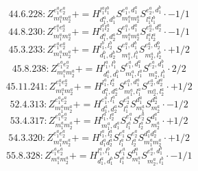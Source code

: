 \documentclass[letterpaper,10pt,fleqn,leqno,onecolumn]{article}
\begin{document}
\begin{equation} \;\;\;\;\;\;  44.6.228: Z^{e_{1}^{a}e_{2}^{a}}_{m_{1}^{a}m_{2}^{a}}+=H^{l_{1}^{a}l_{1}^{b}}_{d_{1}^{a},d_{1}^{b}}S^{e_{1}^{a},d_{1}^{a}}_{m_{1}^{a}m_{2}^{a}}S^{e_{2}^{a},d_{1}^{b}}_{l_{1}^{a}l_{1}^{b}}\cdot -1/1 \end{equation}
\begin{equation} \;\;\;\;\;\;  44.8.230: Z^{e_{1}^{a}e_{2}^{a}}_{m_{1}^{a}m_{2}^{a}}+=H^{l_{1}^{a}l_{2}^{a}}_{d_{1}^{a},d_{2}^{a}}S^{e_{1}^{a},d_{1}^{a}}_{m_{1}^{a}m_{2}^{a}}S^{e_{2}^{a},d_{2}^{a}}_{l_{1}^{a}l_{2}^{a}}\cdot -1/1 \end{equation}
\begin{equation} \;\;\;\;\;\;  45.3.233: Z^{e_{1}^{a}e_{2}^{a}}_{m_{1}^{a}m_{2}^{a}}+=H^{l_{1}^{b},l_{2}^{b}}_{d_{1}^{b},d_{2}^{b}}S^{e_{1}^{a},d_{1}^{b}}_{m_{1}^{a},l_{1}^{b}}S^{e_{2}^{a},d_{2}^{b}}_{m_{2}^{a},l_{2}^{b}}\cdot +1/2 \end{equation}
\begin{equation} \;\;\;\;\;\;  45.8.238: Z^{e_{1}^{a}e_{2}^{a}}_{m_{1}^{a}m_{2}^{a}}+=H^{l_{1}^{a},l_{1}^{b}}_{d_{1}^{a},d_{1}^{b}}S^{e_{1}^{a},d_{1}^{a}}_{m_{1}^{a},l_{1}^{a}}S^{e_{2}^{a},d_{1}^{b}}_{m_{2}^{a},l_{1}^{b}}\cdot 2/2 \end{equation}
\begin{equation} \;\;\;\;\;\;  45.11.241: Z^{e_{1}^{a}e_{2}^{a}}_{m_{1}^{a}m_{2}^{a}}+=H^{l_{1}^{a},l_{2}^{a}}_{d_{1}^{a},d_{2}^{a}}S^{e_{1}^{a},d_{1}^{a}}_{m_{1}^{a},l_{1}^{a}}S^{e_{2}^{a},d_{2}^{a}}_{m_{2}^{a},l_{2}^{a}}\cdot +1/2 \end{equation}
\begin{equation} \;\;\;\;\;\;  52.4.313: Z^{e_{1}^{a}e_{2}^{a}}_{m_{1}^{a}m_{2}^{a}}+=H^{e_{1}^{a},l_{1}^{a}}_{d_{1}^{a},d_{2}^{a}}S^{e_{2}^{a}}_{l_{1}^{a}}S^{d_{1}^{a}}_{m_{1}^{a}}S^{d_{2}^{a}}_{m_{2}^{a}}\cdot -1/2 \end{equation}
\begin{equation} \;\;\;\;\;\;  53.4.317: Z^{e_{1}^{a}e_{2}^{a}}_{m_{1}^{a}m_{2}^{a}}+=H^{l_{1}^{a},l_{2}^{a}}_{m_{1}^{a},d_{1}^{a}}S^{e_{1}^{a}}_{l_{1}^{a}}S^{e_{2}^{a}}_{l_{2}^{a}}S^{d_{1}^{a}}_{m_{2}^{a}}\cdot +1/2 \end{equation}
\begin{equation} \;\;\;\;\;\;  54.3.320: Z^{e_{1}^{a}e_{2}^{a}}_{m_{1}^{a}m_{2}^{a}}+=H^{l_{1}^{a},l_{2}^{a}}_{d_{1}^{a}d_{2}^{a}}S^{e_{1}^{a}}_{l_{1}^{a}}S^{e_{2}^{a}}_{l_{2}^{a}}S^{d_{1}^{a}d_{2}^{a}}_{m_{1}^{a}m_{2}^{a}}\cdot +1/2 \end{equation}
\begin{equation} \;\;\;\;\;\;  55.8.328: Z^{e_{1}^{a}e_{2}^{a}}_{m_{1}^{a}m_{2}^{a}}+=H^{l_{1}^{a},l_{1}^{b}}_{d_{1}^{a},d_{1}^{b}}S^{e_{1}^{a}}_{l_{1}^{a}}S^{d_{1}^{a}}_{m_{1}^{a}}S^{e_{2}^{a},d_{1}^{b}}_{m_{2}^{a},l_{1}^{b}}\cdot -1/1 \end{equation}
\end{document}

